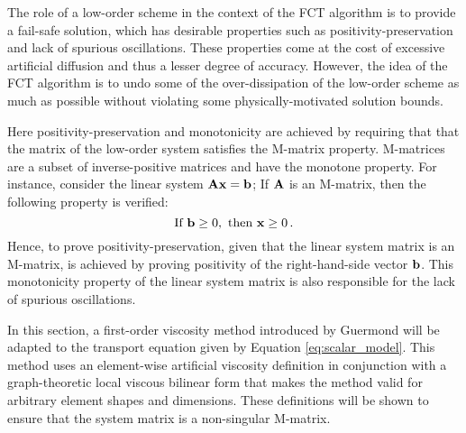 
The role of a low-order scheme in the context of the FCT algorithm is to
provide a fail-safe solution, which has desirable properties such as
positivity-preservation and lack of spurious oscillations. These properties
come at the cost of excessive artificial diffusion and thus a lesser degree
of accuracy. However, the idea of the FCT algorithm is to undo some of the over-dissipation 
of the low-order scheme as much as possible without violating some physically-motivated solution bounds.

Here positivity-preservation and monotonicity are achieved by 
requiring that that the matrix of the low-order system satisfies the M-matrix property.
M-matrices are a subset of inverse-positive matrices and have the monotone
property. For instance, consider the linear system $\mathbf{A}\mathbf{x} = \mathbf{b}$;
If $\mathbf{A}$ is an M-matrix, then the following property is verified:
\begin{equation}
\text{If }  \mathbf{b} \geq 0, \text{  then  }  \mathbf{x} \geq 0 \,.
\end{equation}
Hence, to prove positivity-preservation, given that the linear system matrix is an
M-matrix, is achieved by proving positivity of the right-hand-side vector $\mathbf{b}$.
This monotonicity property of the linear system matrix is also responsible for
the lack of spurious oscillations.

In this section, a first-order viscosity method introduced by Guermond
\cite{guermond_firstorder} will be adapted to the transport equation given by
Equation \eqref{eq:scalar_model}. This method uses an element-wise artificial
viscosity definition in conjunction with a graph-theoretic local viscous
bilinear form that makes the method valid for arbitrary element shapes and
dimensions. These definitions will be shown to ensure that the system matrix
is a non-singular M-matrix.

